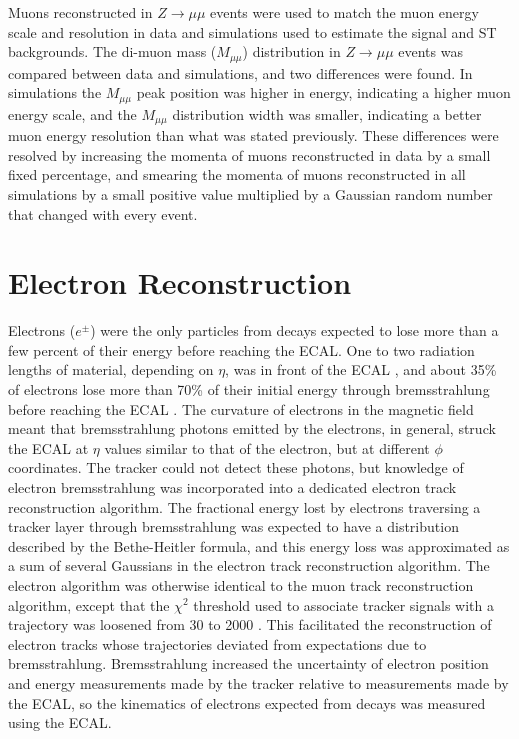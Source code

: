 Muons reconstructed in $Z \rightarrow \mu\mu$ events were used to match the muon energy scale and resolution in data 
and simulations used to estimate the \WR signal and ST backgrounds.  The di-muon mass ($M_{\mu\mu}$) distribution in 
$Z \rightarrow \mu\mu$ events was compared between data and simulations, and two differences were found.  In simulations 
the $M_{\mu\mu}$ peak position was higher in energy, indicating a higher muon energy scale, and the $M_{\mu\mu}$ distribution width 
was smaller, indicating a better muon energy resolution than what was stated previously.  These differences 
were resolved by increasing the momenta of muons reconstructed in data by a small fixed percentage, and smearing the momenta 
of muons reconstructed in all simulations by a small positive value multiplied by a Gaussian random number that changed 
with every event.


\section{Electron Reconstruction}
\label{sec:eleReco}
Electrons ($e^{\pm}$) were the only particles from \WR decays expected to lose more than a few percent of their 
energy before reaching the ECAL.  One to two radiation lengths of material, depending on $\eta$, was in front of 
the ECAL \cite{ecalPerformanceInCollisions}, and about 35\% of electrons lose more than 70\% of their initial energy 
through bremsstrahlung before reaching the ECAL \cite{trackerPerformanceInCollisions}.  The curvature of electrons 
in the magnetic field meant that bremsstrahlung photons emitted by the electrons, in general, struck the ECAL 
at $\eta$ values similar to that of the electron, but at different $\phi$ coordinates.  The tracker could not detect 
these photons, but knowledge of electron bremsstrahlung was incorporated into a dedicated electron track reconstruction 
algorithm.  The fractional energy lost by electrons traversing a tracker layer through bremsstrahlung was expected to 
have a distribution described by the Bethe-Heitler formula, and this energy loss was approximated as a sum of 
several Gaussians in the electron track reconstruction algorithm.  The electron algorithm was otherwise identical to 
the muon track reconstruction algorithm, except that the $\chi^{2}$ threshold used to 
associate tracker signals with a trajectory was loosened from 30 to 2000 \cite{trackerPerformanceInCollisions}.  This 
facilitated the reconstruction of electron tracks whose trajectories deviated from expectations due to bremsstrahlung.  
Bremsstrahlung increased the uncertainty of electron position and energy measurements made by the tracker relative to 
measurements made by the ECAL, so the kinematics of electrons expected from \WR decays was measured using the ECAL.

